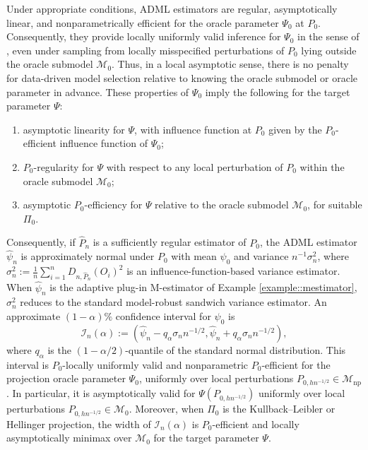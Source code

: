 \documentclass[11pt]{article}
\theoremstyle{definition}
\begin{document}
Under appropriate conditions, ADML estimators are regular, asymptotically linear, and nonparametrically efficient for the oracle parameter \(\Psi_0\) at \(P_0\). Consequently, they provide locally uniformly valid inference for \(\Psi_0\) in the sense of \cite{buhlmann1999efficient}, even under sampling from locally misspecified perturbations of \(P_0\) lying outside the oracle submodel \(\mathcal{M}_0\). Thus, in a local asymptotic sense, there is no penalty for data-driven model selection relative to knowing the oracle submodel or oracle parameter in advance. These properties of \(\Psi_0\) imply the following for the target parameter \(\Psi\):
\begin{enumerate}[label=\roman*., ref=\roman*]
\item asymptotic linearity for \(\Psi\), with influence function at \(P_0\) given by the \(P_0\)-efficient influence function of \(\Psi_0\);
\item \(P_0\)-regularity for \(\Psi\) with respect to any local perturbation of \(P_0\) within the oracle submodel \(\mathcal{M}_0\);
\item asymptotic \(P_0\)-efficiency for \(\Psi\) relative to the oracle submodel \(\mathcal{M}_0\), for suitable \(\Pi_0\).
\end{enumerate}
Consequently, if \(\widehat P_n\) is a sufficiently regular estimator of \(P_0\), the ADML estimator \(\widehat{\psi}_n\) is approximately normal under \(P_0\) with mean \(\psi_0\) and variance \(n^{-1}\sigma_n^2\), where \(\sigma_n^2 := \frac{1}{n}\sum_{i=1}^n D_{n,\widehat P_n}(O_i)^2\) is an influence-function-based variance estimator. When \(\widehat{\psi}_n\) is the adaptive plug-in M-estimator of Example \ref{example::mestimator}, \(\sigma_n^2\) reduces to the standard model-robust sandwich variance estimator. An approximate \((1-\alpha)\%\) confidence interval for \(\psi_0\) is
\[
\mathcal{I}_n(\alpha)
:=
\left(
\widehat{\psi}_n - q_\alpha \sigma_n n^{-1/2},
\widehat{\psi}_n + q_\alpha \sigma_n n^{-1/2}
\right),
\]
where \(q_\alpha\) is the \((1-\alpha/2)\)-quantile of the standard normal distribution. This interval is \(P_0\)-locally uniformly valid and nonparametric \(P_0\)-efficient for the projection oracle parameter \(\Psi_0\), uniformly over local perturbations \(P_{0,hn^{-1/2}} \in \mathcal{M}_{\mathrm{np}}\). In particular, it is asymptotically valid for \(\Psi(P_{0,hn^{-1/2}})\) uniformly over local perturbations \(P_{0,hn^{-1/2}} \in \mathcal{M}_0\). Moreover, when \(\Pi_0\) is the Kullback--Leibler or Hellinger projection, the width of \(\mathcal{I}_n(\alpha)\) is \(P_0\)-efficient and locally asymptotically minimax over \(\mathcal{M}_0\) for the target parameter \(\Psi\).     
\end{document}
